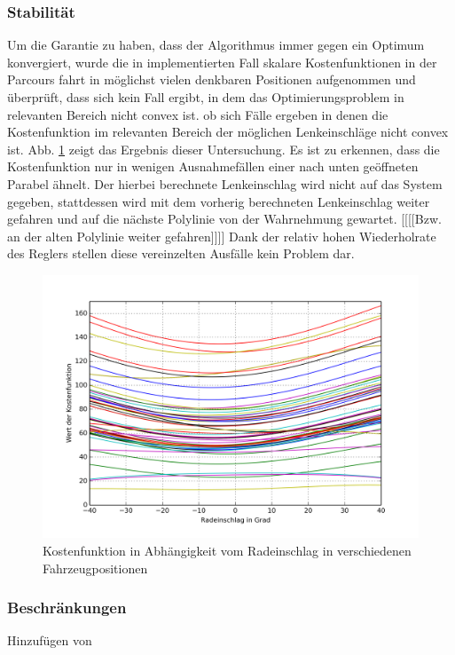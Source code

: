 \subsubsection{Stabilität}
Um die Garantie zu haben, dass der Algorithmus immer gegen ein Optimum konvergiert, wurde die in implementierten Fall skalare Kostenfunktionen in der Parcours fahrt in möglichst vielen denkbaren Positionen aufgenommen und überprüft, dass sich kein Fall ergibt, in dem das Optimierungsproblem in relevanten Bereich nicht convex ist. ob sich Fälle ergeben in denen die Kostenfunktion im relevanten Bereich der möglichen Lenkeinschläge nicht convex ist. Abb. \ref{fig:parabel} zeigt das Ergebnis dieser Untersuchung. Es ist zu erkennen, dass die Kostenfunktion nur in wenigen Ausnahmefällen einer nach unten geöffneten Parabel ähnelt. Der hierbei berechnete Lenkeinschlag wird nicht auf das System gegeben, stattdessen wird mit dem vorherig berechneten Lenkeinschlag weiter gefahren und auf die nächste Polylinie von der Wahrnehmung gewartet. [[[[Bzw. an der alten Polylinie weiter gefahren]]]] Dank der relativ hohen Wiederholrate des Reglers stellen diese vereinzelten Ausfälle kein Problem dar.
\begin{figure}[t]
\centering
\includegraphics[scale=0.75]{Bilder/Parabeln.png}
\caption{Kostenfunktion in Abhängigkeit vom Radeinschlag in verschiedenen Fahrzeugpositionen}
\label{fig:parabel}
\end{figure}

\subsubsection{Beschränkungen}
Hinzufügen von ~

